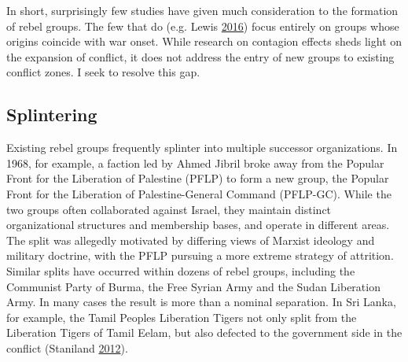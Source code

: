 \documentclass[12pt,]{book}
\theoremstyle{definition}
\theoremstyle{definition}
\theoremstyle{remark}
\begin{document}
In short, surprisingly few studies have given much consideration to the
formation of rebel groups. The few that do (e.g. Lewis
\protect\hyperlink{ref-Lewis2016}{2016}) focus entirely on groups whose
origins coincide with war onset. While research on contagion effects
sheds light on the expansion of conflict, it does not address the entry
of new groups to existing conflict zones. I seek to resolve this gap.

\subsection{Splintering}\label{splintering}

Existing rebel groups frequently splinter into multiple successor
organizations. In 1968, for example, a faction led by Ahmed Jibril broke
away from the Popular Front for the Liberation of Palestine (PFLP) to
form a new group, the Popular Front for the Liberation of
Palestine-General Command (PFLP-GC). While the two groups often
collaborated against Israel, they maintain distinct organizational
structures and membership bases, and operate in different areas. The
split was allegedly motivated by differing views of Marxist ideology and
military doctrine, with the PFLP pursuing a more extreme strategy of
attrition. Similar splits have occurred within dozens of rebel groups,
including the Communist Party of Burma, the Free Syrian Army and the
Sudan Liberation Army. In many cases the result is more than a nominal
separation. In Sri Lanka, for example, the Tamil Peoples Liberation
Tigers not only split from the Liberation Tigers of Tamil Eelam, but
also defected to the government side in the conflict (Staniland
\protect\hyperlink{ref-Staniland2012d}{2012}).
\end{document}
